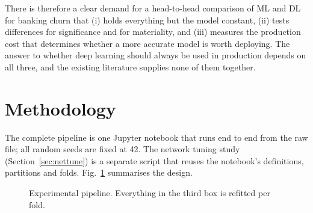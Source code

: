\documentclass[conference]{IEEEtran}
\begin{document}
There is therefore a clear demand for a head-to-head comparison of ML and DL for banking churn that (i) holds everything but the model constant, (ii) tests differences for significance and for materiality, and (iii) measures the production cost that determines whether a more accurate model is worth deploying. The answer to whether deep learning should always be used in production depends on all three, and the existing literature supplies none of them together.

\section{Methodology}
The complete pipeline is one Jupyter notebook that runs end to end from the raw file; all random seeds are fixed at 42. The network tuning study (Section~\ref{sec:nettune}) is a separate script that reuses the notebook's definitions, partitions and folds. Fig.~\ref{fig:pipeline} summarises the design.

\begin{figure}[t]
\centering
{}
\caption{Experimental pipeline. Everything in the third box is refitted per fold.}
\label{fig:pipeline}
\end{figure}
\end{document}
